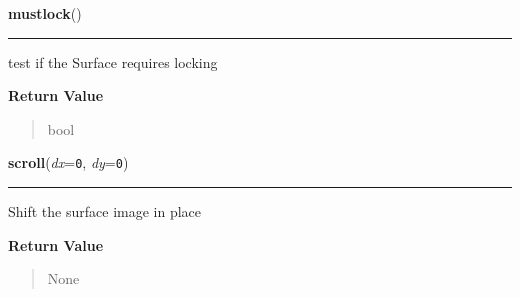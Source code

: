 \hspace{.8\funcindent}\begin{boxedminipage}{\funcwidth}

    \raggedright \textbf{mustlock}()

    \vspace{-1.5ex}

    \rule{\textwidth}{0.5\fboxrule}
\setlength{\parskip}{2ex}
    test if the Surface requires locking

\setlength{\parskip}{1ex}
      \textbf{Return Value}
    \vspace{-1ex}

      \begin{quote}
      bool

      \end{quote}

    \end{boxedminipage}

    \label{pygame:Surface:scroll}

    \vspace{0.5ex}

\hspace{.8\funcindent}\begin{boxedminipage}{\funcwidth}

    \raggedright \textbf{scroll}(\textit{dx}={\tt 0}, \textit{dy}={\tt 0})

    \vspace{-1.5ex}

    \rule{\textwidth}{0.5\fboxrule}
\setlength{\parskip}{2ex}
    Shift the surface image in place

\setlength{\parskip}{1ex}
      \textbf{Return Value}
    \vspace{-1ex}

      \begin{quote}
      None

      \end{quote}

    \end{boxedminipage}

    \label{pygame:Surface:set_alpha}

    \vspace{0.5ex}

